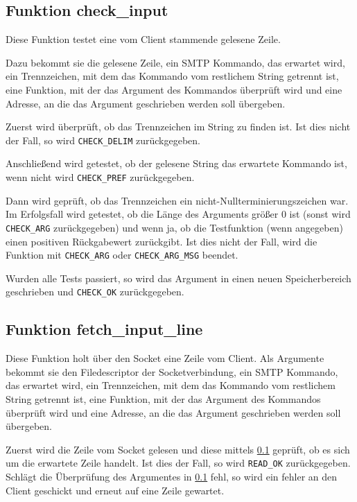 \documentclass[pdftex,final,a4paper,10pt,notitlepage,halfparskip]{scrreprt}
\begin{document}
\subsection{Funktion check\_input}\label{fn:check_input}
Diese Funktion testet eine vom Client stammende gelesene Zeile.

Dazu bekommt sie die gelesene Zeile, ein SMTP Kommando, das erwartet wird, ein Trennzeichen, mit dem das Kommando vom restlichem String getrennt ist, eine Funktion, mit der das Argument des Kommandos überprüft wird und eine Adresse, an die das Argument geschrieben werden soll übergeben.

Zuerst wird überprüft, ob das Trennzeichen im String zu finden ist. Ist dies nicht der Fall, so wird \texttt{CHECK\_DELIM} zurückgegeben.

Anschließend wird getestet, ob der gelesene String das erwartete Kommando ist, wenn nicht wird \texttt{CHECK\_PREF} zurückgegeben.

Dann wird geprüft, ob das Trennzeichen ein nicht-Nullterminierungszeichen war. Im Erfolgsfall wird getestet, ob die Länge des Arguments größer 0 ist (sonst wird \texttt{CHECK\_ARG} zurückgegeben) und wenn ja, ob die Testfunktion (wenn angegeben) einen positiven Rückgabewert zurückgibt. Ist dies nicht der Fall, wird die Funktion mit \texttt{CHECK\_ARG} oder \texttt{CHECK\_ARG\_MSG} beendet.

Wurden alle Tests passiert, so wird das Argument in einen neuen Speicherbereich geschrieben und \texttt{CHECK\_OK} zurückgegeben.

\subsection{Funktion fetch\_input\_line}\label{fn:fetch_input_line}
Diese Funktion holt über den Socket eine Zeile vom Client. Als Argumente bekommt sie den Filedescriptor der Socketverbindung, ein SMTP Kommando, das erwartet wird, ein Trennzeichen, mit dem das Kommando vom restlichem String getrennt ist, eine Funktion, mit der das Argument des Kommandos überprüft wird und eine Adresse, an die das Argument geschrieben werden soll übergeben.

Zuerst wird die Zeile vom Socket gelesen und diese mittels \ref{fn:check_input} geprüft, ob es sich um die erwartete Zeile handelt. Ist dies der Fall, so wird \texttt{READ\_OK} zurückgegeben. Schlägt die Überprüfung des Argumentes in \ref{fn:check_input} fehl, so wird ein fehler an den Client geschickt und erneut auf eine Zeile gewartet.
\end{document}
